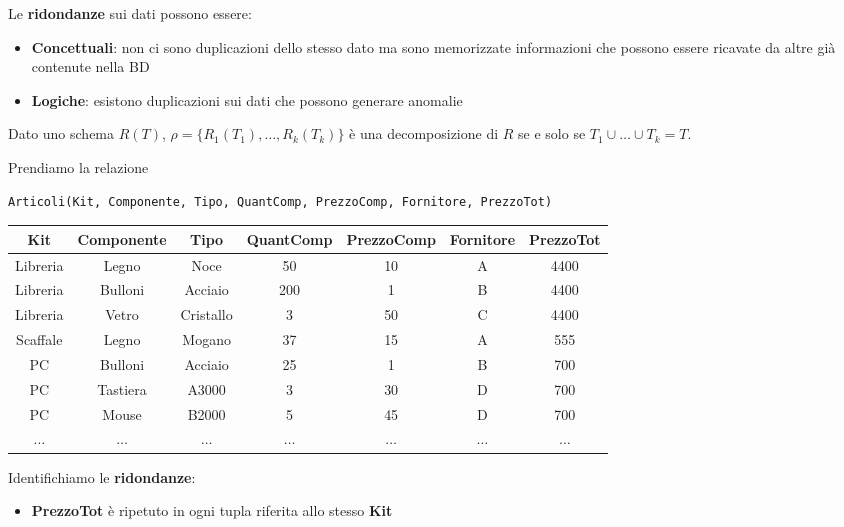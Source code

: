 \noindent Le \textbf{ridondanze} sui dati possono essere:
\begin{itemize}
	\item \textbf{Concettuali}: non ci sono duplicazioni dello stesso dato ma sono memorizzate informazioni che possono essere ricavate da altre già contenute nella BD
	\item \textbf{Logiche}: esistono duplicazioni sui dati che possono generare anomalie
\end{itemize}

\begin{definition}[Decomposizione]
	Dato uno schema $R(T)$,	$\rho = \{R_1(T_1),\ldots, R_k(T_k)\}$ è una decomposizione di $R$ se e solo se $T_1 \cup  \ldots \cup T_k = T$.
\end{definition}

\begin{example}[Decomposizione]
	Prendiamo la relazione
	\begin{lstlisting}[language=SQL]
		Articoli(Kit, Componente, Tipo, QuantComp, PrezzoComp, Fornitore, PrezzoTot)
	\end{lstlisting}
	\begin{table}[!h]
		\centering
		\begin{tabular}{|c|c|c|c|c|c|c|}
			\hline
			\textbf{Kit} & \textbf{Componente} & \textbf{Tipo} & \textbf{QuantComp} & \textbf{PrezzoComp} & \textbf{Fornitore} & \textbf{PrezzoTot} \\
			\hline
			Libreria & Legno & Noce & 50 & 10 & A & 4400 \\
			\hline
			Libreria & Bulloni & Acciaio & 200 & 1 & B & 4400 \\
			\hline
			Libreria & Vetro & Cristallo & 3 & 50 & C & 4400 \\
			\hline
			Scaffale &Legno & Mogano & 37 & 15 & A & 555 \\
			\hline
			PC & Bulloni & Acciaio & 25 & 1 & B & 700 \\
			\hline
			PC & Tastiera & A3000 & 3 & 30 & D & 700\\
			\hline
			PC & Mouse & B2000 & 5 & 45 & D & 700 \\
			\hline
			$\ldots$ & $\ldots$ & $\ldots$ & $\ldots$ & $\ldots$ & $\ldots$ & $\ldots$ \\
			\hline
		\end{tabular}
	\end{table}
	Identifichiamo le \textbf{ridondanze}:
	\begin{itemize}
		\item \textbf{PrezzoTot} è ripetuto in ogni tupla riferita allo stesso \textbf{Kit}

\end{itemize}
\end{example}
